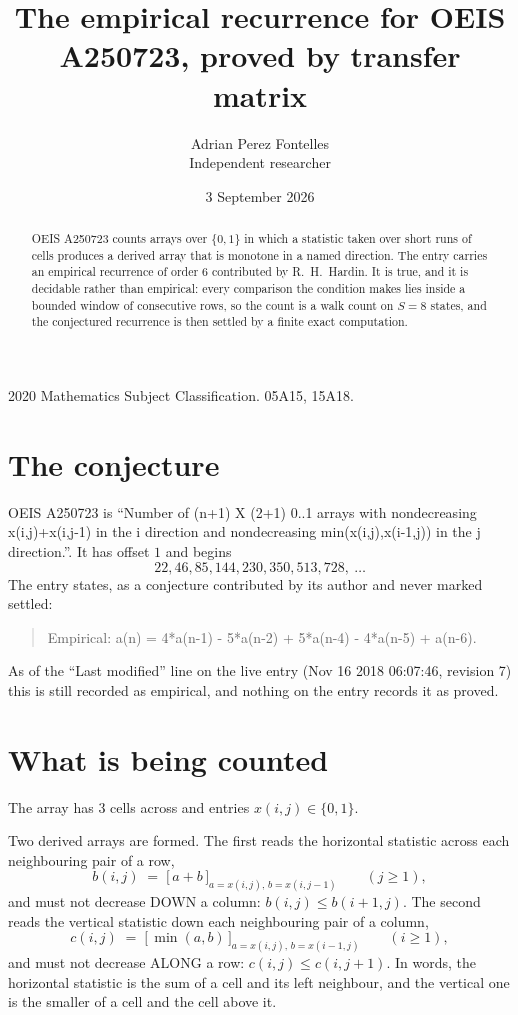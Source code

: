 \documentclass[11pt,a4paper]{article}
\title{The empirical recurrence for OEIS A250723, proved by transfer matrix}
\author{Adrian Perez Fontelles\\ \small Independent researcher}
\date{3 September 2026}
\theoremstyle{plain}
\theoremstyle{definition}
\begin{document}
\maketitle

\begin{abstract}
OEIS A250723 counts arrays over $\{0,1\}$ in which a statistic taken over short runs
of cells produces a derived array that is monotone in a named direction. The entry carries an
empirical recurrence of order $6$ contributed by R.~H.~Hardin. It is true, and it is
decidable rather than empirical: every comparison the condition makes lies inside a bounded
window of consecutive rows, so the count is a walk count on $S=8$ states, and the
conjectured recurrence is then settled by a finite exact computation.
\end{abstract}

\noindent\small 2020 Mathematics Subject Classification. 05A15, 15A18.\normalsize

\section{The conjecture}

OEIS A250723 is ``Number of (n+1) X (2+1) 0..1 arrays with nondecreasing x(i,j)+x(i,j-1) in the i direction and nondecreasing min(x(i,j),x(i-1,j)) in the j direction.''. It has offset $1$ and begins
\[
22, 46, 85, 144, 230, 350, 513, 728,\ \dots
\]
The entry states, as a conjecture contributed by its author and never marked settled:
\begin{quote}
Empirical: a(n) = 4*a(n-1) - 5*a(n-2) + 5*a(n-4) - 4*a(n-5) + a(n-6).
\end{quote}
As of the ``Last modified'' line on the live entry (Nov 16 2018 06:07:46, revision 7) this is still
recorded as empirical, and nothing on the entry records it as proved.

\section{What is being counted}

The array has $3$ cells across and entries $x(i,j)\in\{0,1\}$.

Two derived arrays are formed. The first reads the horizontal statistic across each
neighbouring pair of a row,
\[
b(i,j)\;=\;\bigl[\,a+b\,\bigr]_{a=x(i,j),\,b=x(i,j-1)}\qquad (j\ge1),
\]
and must not decrease DOWN a column: $b(i,j)\le b(i{+}1,j)$. The second reads the vertical
statistic down each neighbouring pair of a column,
\[
c(i,j)\;=\;\bigl[\,\min(a,b)\,\bigr]_{a=x(i,j),\,b=x(i{-}1,j)}\qquad (i\ge1),
\]
and must not decrease ALONG a row: $c(i,j)\le c(i,j{+}1)$. In words, the horizontal statistic
is the sum of a cell and its left neighbour, and the vertical one is
the smaller of a cell and the cell above it.
\end{document}

